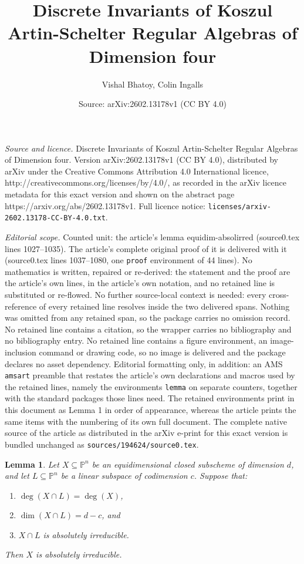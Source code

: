 \documentclass[10pt,a4paper]{amsart}
\title{Discrete Invariants of Koszul Artin-Schelter Regular Algebras of Dimension four}
\author{Vishal Bhatoy, Colin Ingalls}
\date{Source: arXiv:2602.13178v1 (CC BY 4.0)}
\newtheorem{lemma}{Lemma}
\begin{document}
\maketitle

\noindent\emph{Source and licence.} Discrete Invariants of Koszul Artin-Schelter Regular Algebras of Dimension four. Version arXiv:2602.13178v1 (CC BY 4.0), distributed by arXiv under the Creative Commons Attribution 4.0 International licence, http://creativecommons.org/licenses/by/4.0/, as recorded in the arXiv licence metadata for this exact version and shown on the abstract page https://arxiv.org/abs/2602.13178v1. Full licence notice: \texttt{licenses/arxiv-2602.13178-CC-BY-4.0.txt}.\par\smallskip

\noindent\textit{Editorial scope.} Counted unit: the article's lemma equidim-absolirred (source0.tex lines 1027--1035). The article's complete original proof of it is delivered with it (source0.tex lines 1037--1080, one \texttt{proof} environment of 44 lines). No mathematics is written, repaired or re-derived: the statement and the proof are the article's own lines, in the article's own notation, and no retained line is substituted or re-flowed.  No further source-local context is needed: every cross-reference of every retained line resolves inside the two delivered spans.  Nothing was omitted from any retained span, so the package carries no omission record.  No retained line contains a citation, so the wrapper carries no bibliography and no bibliography entry.  No retained line contains a figure environment, an image-inclusion command or drawing code, so no image is delivered and the package declares no asset dependency.  Editorial formatting only, in addition: an AMS \texttt{amsart} preamble that restates the article's own declarations and macros used by the retained lines, namely the environments \texttt{lemma} on separate counters, together with the standard packages those lines need.  The retained environments print in this document as Lemma 1 in order of appearance, whereas the article prints the same items with the numbering of its own full document.  The complete native source of the article as distributed in the arXiv e-print for this exact version is bundled unchanged as \texttt{sources/194624/source0.tex}.
\begin{lemma}\label{equidim-absolirred}
Let \( X \subseteq \mathbb{P}^n \) be an equidimensional closed subscheme of dimension \( d \), and let \( L \subseteq \mathbb{P}^n \) be a linear subspace of codimension \( c \). Suppose that:
\begin{enumerate}
  \item \( \deg(X \cap L) = \deg(X) \),
  \item \( \dim(X \cap L) = d - c \), and
  \item \( X \cap L \) is absolutely irreducible.
\end{enumerate}
Then \( X \) is absolutely irreducible.
\end{lemma}
\end{document}
